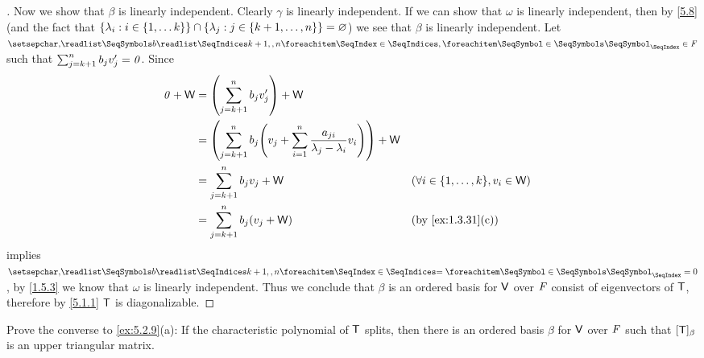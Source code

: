 \begin{proof}[]
  Now we show that \(\beta\) is linearly independent.
  Clearly \(\gamma\) is linearly independent.
  If we can show that \(\omega\) is linearly independent, then by \cref{5.8} (and the fact that \(\left\lbrace\lambda_i : i \in \left\lbrace1, \dots k\right\rbrace\right\rbrace \cap \left\lbrace\lambda_j : j \in \left\lbrace k + 1, \dots, n\right\rbrace\right\rbrace = \varnothing\)) we see that \(\beta\) is linearly independent.
  Let \(\seq{b}{k+1,,n} \in \F\) such that \(\sum_{j = k + 1}^n b_j v_j' = \mathit{0}\).
  Since
  \begin{align*}
    \zv + \W & = \pa{\sum_{j = k + 1}^n b_j v_j'} + \W                                                                                                                   \\
             & = \pa{\sum_{j = k + 1}^n b_j \pa{v_j + \sum_{i = 1}^n \frac{a_{j i}}{\lambda_j - \lambda_i} v_i}} + \W                                                    \\
             & = \sum_{j = k + 1}^n b_j v_j + \W                                                                      &  & (\forall i \in \set{1, \dots, k}, v_i \in \W) \\
             & = \sum_{j = k + 1}^n b_j (v_j + \W)                                                                    &  & \text{(by \cref{ex:1.3.31}(c))}
  \end{align*}
  implies \(\seq[=]{b}{k+1,,n} = 0\), by \cref{1.5.3} we know that \(\omega\) is linearly independent.
  Thus we conclude that \(\beta\) is an ordered basis for \(\mathsf{V}\) over \(\mathit{F}\) consist of eigenvectors of \(\mathsf{T}\), therefore by \cref{5.1.1} \(\mathsf{T}\) is diagonalizable.
\end{proof}

\setcounter{ex}{31}
\begin{ex}\label{ex:5.4.32}
  Prove the converse to \cref{ex:5.2.9}(a):
  If the characteristic polynomial of \(\mathsf{T}\) splits, then there is an ordered basis \(\beta\) for \(\mathsf{V}\) over \(\mathit{F}\) such that \([\mathsf{T}]_{\beta}\) is an upper triangular matrix.
\end{ex}

